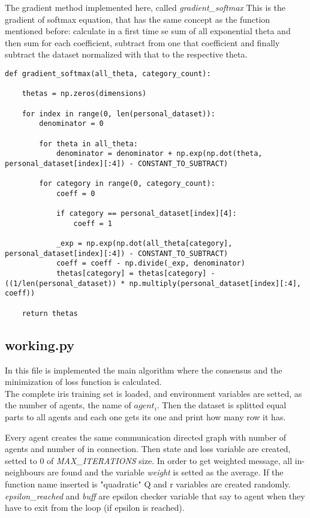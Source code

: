 \documentclass[a4paper,11pt,oneside]{book}
\begin{document}
The gradient method implemented here, called \textit{gradient\_softmax} This is the gradient of softmax equation, that has
the same concept as the function mentioned before: calculate in a first time se sum of all exponential theta and then sum for
each coefficient, subtract from one that coefficient and finally subtract the dataset normalized with that to the respective
theta.

\begin{lstlisting}
def gradient_softmax(all_theta, category_count):

    thetas = np.zeros(dimensions)

    for index in range(0, len(personal_dataset)):
        denominator = 0

        for theta in all_theta:
            denominator = denominator + np.exp(np.dot(theta, personal_dataset[index][:4]) - CONSTANT_TO_SUBTRACT)

        for category in range(0, category_count):
            coeff = 0

            if category == personal_dataset[index][4]:
                coeff = 1

            _exp = np.exp(np.dot(all_theta[category], personal_dataset[index][:4]) - CONSTANT_TO_SUBTRACT)
            coeff = coeff - np.divide(_exp, denominator)
            thetas[category] = thetas[category] - ((1/len(personal_dataset)) * np.multiply(personal_dataset[index][:4], coeff))

    return thetas
\end{lstlisting}

\subsection {working.py}

In this file is implemented the main algorithm where the consensus and the minimization of loss function is calculated.\\

The complete iris training set is loaded, and environment variables are setted, as the number of agents, the name of $agent_{i
}$. Then the dataset is splitted equal parts to all agents and each one gets its one and print how many row it has.

Every agent creates the same communication directed graph with number of agents and number of in connection. Then state and
loss variable are created, setted to 0 of \textit{MAX\_ITERATIONS} size. In order to get weighted message, all in-neighbours
are found and the variable \textit{weight} is setted as the average. If the function name inserted is "quadratic" Q and r
variables are created randomly. \textit{epsilon\_reached} and \textit{buff} are epsilon checker variable that say to agent
when they have to exit from the loop (if epsilon is reached).
\end{document}
